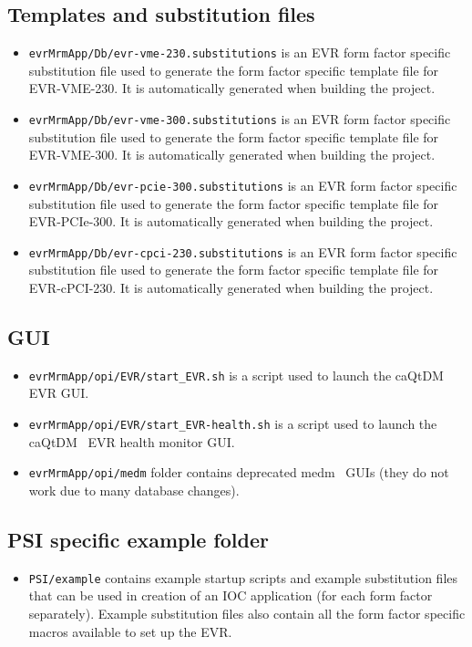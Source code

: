 \documentclass[12pt,a4paper]{article}
\begin{document}
\subsection{Templates and substitution files}\label{sec:mrfioc2 organization:substitution}
\begin{itemize}
\item 
	\texttt{evrMrmApp/Db/evr-vme-230.substitutions} is an EVR form factor specific substitution file used to generate the form factor specific template file for EVR-VME-230. It is automatically generated when building the project.
\item 
	\texttt{evrMrmApp/Db/evr-vme-300.substitutions} is an EVR form factor specific substitution file used to generate the form factor specific template file for EVR-VME-300. It is automatically generated when building the project.
\item 
	\texttt{evrMrmApp/Db/evr-pcie-300.substitutions} is an EVR form factor specific substitution file used to generate the form factor specific template file for EVR-PCIe-300. It is automatically generated when building the project.
\item 
	\texttt{evrMrmApp/Db/evr-cpci-230.substitutions} is an EVR form factor specific substitution file used to generate the form factor specific template file for EVR-cPCI-230. It is automatically generated when building the project.
\end{itemize}

\subsection{GUI}\label{sec:mrfioc2 organization:gui}
\begin{itemize}
\item 
	\texttt{evrMrmApp/opi/EVR/start\_EVR.sh} is a script used to launch the caQtDM~\cite{caqtdm} EVR GUI.
\item 
	\texttt{evrMrmApp/opi/EVR/start\_EVR-health.sh} is a script used to launch the caQtDM~\cite{caqtdm} EVR health monitor GUI.
\item 
	\texttt{evrMrmApp/opi/medm} folder contains deprecated medm~\cite{medm} GUIs (they do not work due to many database changes).
\end{itemize}

\subsection{PSI specific example folder}\label{sec:PSI specifics}
\begin{itemize}
\item 
	\texttt{PSI/example} contains example startup scripts and example substitution files that can be used in creation of an IOC application (for each form factor separately). Example substitution files also contain all the form factor specific macros available to set up the EVR.
\end{itemize}
\end{document}
